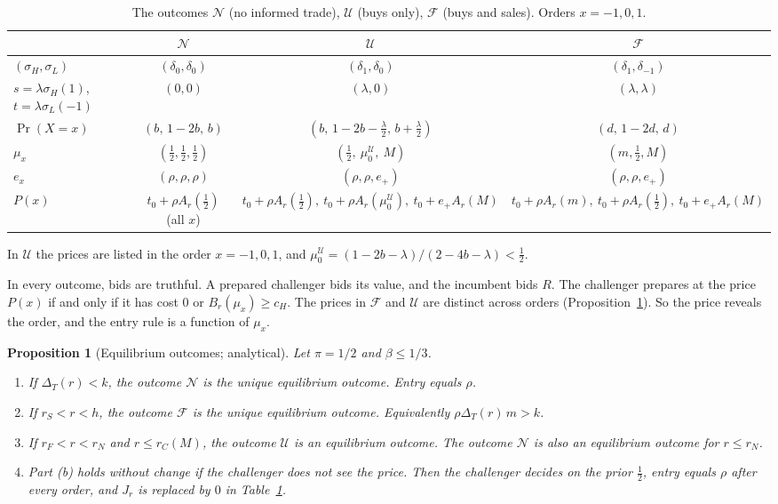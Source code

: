 \documentclass[12pt]{article}
\newtheorem{proposition}{Proposition}
\theoremstyle{definition}
\newcommand{\cH}{c_H}
\begin{document}
\begin{table}[htbp]
\centering\small
\caption{The outcomes $\mathcal N$ (no informed trade), $\mathcal U$ (buys only), $\mathcal F$ (buys and sales). Orders $x=-1,0,1$.}\label{tab:tuples}
\begin{tabular}{@{}lccc@{}}
\toprule
 & $\mathcal N$ & $\mathcal U$ & $\mathcal F$\\
\midrule
$(\sigma_H,\sigma_L)$ & $(\delta_0,\delta_0)$ & $(\delta_1,\delta_0)$ & $(\delta_1,\delta_{-1})$\\
$s=\lambda\sigma_H(1)$, $t=\lambda\sigma_L(-1)$ & $(0,0)$ & $(\lambda,0)$ & $(\lambda,\lambda)$\\
$\Pr(X=x)$ & $(b,\,1-2b,\,b)$ & $(b,\,1-2b-\tfrac\lambda2,\,b+\tfrac\lambda2)$ & $(d,\,1-2d,\,d)$\\
$\mu_x$ & $(\tfrac12,\tfrac12,\tfrac12)$ & $(\tfrac12,\ \mu_0^{\mathcal U},\ M)$ & $(m,\tfrac12,M)$\\
$e_x$ & $(\rho,\rho,\rho)$ & $(\rho,\rho,e_+)$ & $(\rho,\rho,e_+)$\\
$P(x)$ & $t_0+\rho A_r(\tfrac12)$ (all $x$) & $t_0+\rho A_r(\tfrac12),\ t_0+\rho A_r(\mu_0^{\mathcal U}),\ t_0+e_+A_r(M)$ & $t_0+\rho A_r(m),\ t_0+\rho A_r(\tfrac12),\ t_0+e_+A_r(M)$\\
\bottomrule
\end{tabular}

\smallskip
\footnotesize In $\mathcal U$ the prices are listed in the order $x=-1,0,1$, and $\mu_0^{\mathcal U}=(1-2b-\lambda)/(2-4b-\lambda)<\tfrac12$.
\end{table}

In every outcome, bids are truthful.
A prepared challenger bids its value, and the incumbent bids $R$.
The challenger prepares at the price $P(x)$ if and only if it has cost $0$ or $B_r(\mu_x)\ge\cH$.
The prices in $\mathcal F$ and $\mathcal U$ are distinct across orders (Proposition~\ref{p:out}).
So the price reveals the order, and the entry rule is a function of $\mu_x$.

\begin{proposition}[Equilibrium outcomes; analytical]\label{p:out}
Let $\pi=1/2$ and $\beta\le1/3$.
\begin{enumerate}[label=(\alph*)]
\item If $\Delta_T(r)<k$, the outcome $\mathcal N$ is the unique equilibrium outcome. Entry equals $\rho$.
\item If $r_S<r<h$, the outcome $\mathcal F$ is the unique equilibrium outcome. Equivalently $\rho\Delta_T(r)\,m>k$.
\item If $r_F<r<r_N$ and $r\le r_C(M)$, the outcome $\mathcal U$ is an equilibrium outcome. The outcome $\mathcal N$ is also an equilibrium outcome for $r\le r_N$.
\item Part (b) holds without change if the challenger does not see the price. Then the challenger decides on the prior $\tfrac12$, entry equals $\rho$ after every order, and $J_r$ is replaced by $0$ in Table~\ref{tab:tuples}.
\end{enumerate}
\end{proposition}
\end{document}
